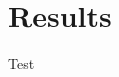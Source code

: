 \chapter{Results}
\label{chap:results}

Test


\begin{comment}
\section{Prefit Event yields}
The prefit yields of the 2-lepton channel before fitting is shown in Table~\ref{tab:yields}.

\scalebox{0.80}{
\begin{tabular}{|l|c|}
\cline{1-2}
 & \multicolumn{1}{|c|}{Merged V+jet CR}\\ \hline
W & 3.13 $\pm$ 0.35\\
Z & 7964.27 $\pm$ 792.98\\
Diboson & 283.38 $\pm$ 143.63\\
stop & 8.21 $\pm$ 2.92\\
ttbar & 194.44 $\pm$ 28.20\\
\hline
Bkg & 8453.43 $\pm$ 844.02\\
\hline
EW6llqq & 29.67 $\pm$ 3.73\\
\hline
Signal & 29.67 $\pm$ 3.73\\
SignalExpected & 29.67 $\pm$ 3.73\\
\hline
S/B & 3.51e-03\\
S/sqrt(S+B) & 3.22e-01\\
\hline
data & 6645\\ \hline
\end{tabular}
}

\scalebox{0.80}{
\begin{tabular}{|l|c|}
\cline{1-2}
 & \multicolumn{1}{|c|}{Resolved CR}\\ \hline
W & 57.63 $\pm$ 11.31\\
Z & 228206.01 $\pm$ 39622.91\\
Diboson & 4645.71 $\pm$ 1460.84\\
stop & 266.54 $\pm$ 88.88\\
ttbar & 7306.82 $\pm$ 1070.92\\
\hline
Bkg & 240482.70 $\pm$ 40883.23\\
\hline
EW6llqq & 421.60 $\pm$ 31.07\\
\hline
Signal & 421.60 $\pm$ 31.07\\
SignalExpected & 421.60 $\pm$ 31.07\\
\hline
S/B & 1.75e-03\\
S/sqrt(S+B) & 8.59e-01\\
\hline
data & 200097\\ \hline
\end{tabular}
}


\end{comment}
